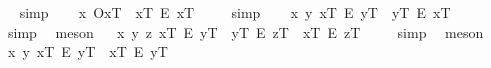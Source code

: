 \begin{isabellebody}
\isadelimproof
\ %
\endisadelimproof
%
\isatagproof
{}\isamarkupfalse%
\ simp\ \isamarkupfalse%
%
\endisatagproof
{\isafoldproof}%
%
\isadelimproof
%
\endisadelimproof
\isanewline
\isanewline
\ \isamarkupfalse%
\ {\isachardoublequoteopen}{\isacharbrackleft}{\isacharparenleft}\isactrlbold {\isasymforall}x{\isachardot}\ {\isasymlparr}O{\isacharbang}{\isacharcomma}x\isactrlsup T{\isasymrparr}\ \isactrlbold {\isasymrightarrow}\ x\isactrlsup T\ \isactrlbold {\isacharequal}\isactrlsub E\ x\isactrlsup T{\isacharparenright}{\isacharbrackright}\ {\isacharequal}\ {\isasymtop}{\isachardoublequoteclose}%
\isadelimproof
\ %
\endisadelimproof
%
\isatagproof
{}\isamarkupfalse%
\ simp\ \isamarkupfalse%
%
\endisatagproof
{\isafoldproof}%
%
\isadelimproof
%
\endisadelimproof
\isanewline
\ \isamarkupfalse%
\ {\isachardoublequoteopen}{\isacharbrackleft}{\isacharparenleft}\isactrlbold {\isasymforall}x\ y{\isachardot}\ x\isactrlsup T\ \isactrlbold {\isacharequal}\isactrlsub E\ y\isactrlsup T\ \isactrlbold {\isasymrightarrow}\ y\isactrlsup T\ \isactrlbold {\isacharequal}\isactrlsub E\ x\isactrlsup T{\isacharparenright}{\isacharbrackright}\ {\isacharequal}\ {\isasymtop}{\isachardoublequoteclose}%
\isadelimproof
\ %
\endisadelimproof
%
\isatagproof
{}\isamarkupfalse%
\ simp\ \isamarkupfalse%
\ meson%
\endisatagproof
{\isafoldproof}%
%
\isadelimproof
%
\endisadelimproof
\isanewline
\ \isamarkupfalse%
\ {\isachardoublequoteopen}{\isacharbrackleft}{\isacharparenleft}\isactrlbold {\isasymforall}x\ y\ z{\isachardot}\ {\isacharparenleft}x\isactrlsup T\ \isactrlbold {\isacharequal}\isactrlsub E\ y\isactrlsup T\ \isactrlbold {\isasymand}\ y\isactrlsup T\ \isactrlbold {\isacharequal}\isactrlsub E\ z\isactrlsup T{\isacharparenright}\ \isactrlbold {\isasymrightarrow}\ x\isactrlsup T\ \isactrlbold {\isacharequal}\isactrlsub E\ z\isactrlsup T{\isacharparenright}{\isacharbrackright}\ {\isacharequal}\ {\isasymtop}{\isachardoublequoteclose}%
\isadelimproof
\ %
\endisadelimproof
%
\isatagproof
{}\isamarkupfalse%
\ simp\ \isamarkupfalse%
\ meson%
\endisatagproof
{\isafoldproof}%
%
\isadelimproof
%
\endisadelimproof
\isanewline
\ \isamarkupfalse%
\ {\isachardoublequoteopen}{\isacharbrackleft}{\isacharparenleft}\isactrlbold {\isasymforall}x\ y{\isachardot}\ x\isactrlsup T\ \isactrlbold {\isacharequal}\isactrlsub E\ y\isactrlsup T\ \isactrlbold {\isasymrightarrow}\ \isactrlbold {\isasymbox}{\isacharparenleft}x\isactrlsup T\ \isactrlbold {\isacharequal}\isactrlsub E\ y\isactrlsup T{\isacharparenright}{\isacharparenright}{\isacharbrackright}\ {\isacharequal}\ {\isasymtop}{\isachardoublequoteclose}%

\end{isabellebody}

